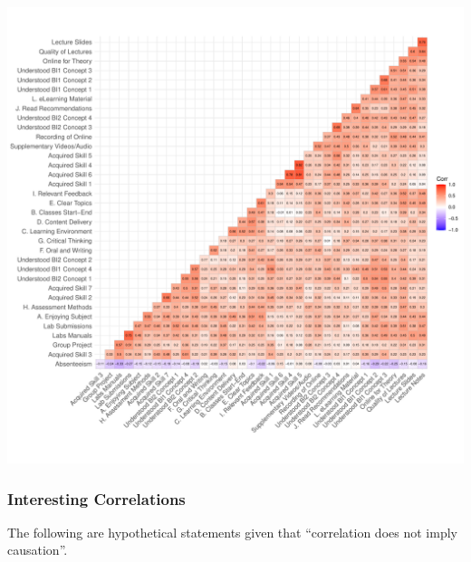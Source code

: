 \documentclass[
]{article}
\begin{document}
\includegraphics{10.b.BBT4206-End-SemesterCourseEvaluation-20230821-20231128-BI2-BBIT4-2_files/figure-latex/CorrelationMatrixWithFigures-1.pdf}

\subsubsection{Interesting Correlations}\label{interesting-correlations}

The following are hypothetical statements given that ``correlation does
not imply causation''.
\end{document}
